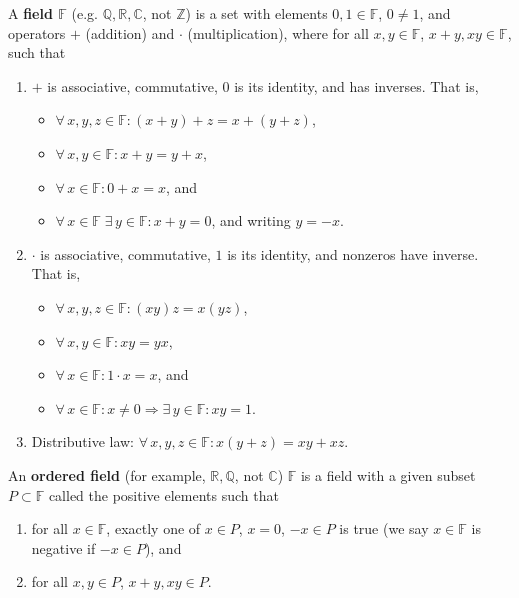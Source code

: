 \documentclass{notes}
\begin{document}
\begin{defn}
  A {\boldmath \bfseries field $\mathbb F$} (e.g. $\mathbb Q, \mathbb R, \mathbb C$, not $\mathbb Z$) is a set with elements $0, 1 \in \mathbb F$, $0 \neq 1$, and operators $+$ (addition) and $\cdot$ (multiplication), where for all $x, y \in \mathbb F$, $x + y, x y \in \mathbb F$, such that
  \begin{enumerate}
    \item $+$ is associative, commutative, $0$ is its identity, and has inverses.
    That is, 
    \begin{itemize}
      \item $\forall \, x, y, z \in \mathbb F: (x + y) + z = x + (y + z)$, 

      \item $\forall \, x, y \in \mathbb F: x + y = y + x$, 

      \item $\forall \, x \in \mathbb F: 0 + x = x$, and

      \item $\forall \, x \in \mathbb F \; \exists \, y \in \mathbb F: x + y = 0$, and writing $y = -x$.
    \end{itemize}

    \item $\cdot$ is associative, commutative, $1$ is its identity, and nonzeros have inverse.
    That is, 
    \begin{itemize}
      \item $\forall \, x, y, z \in \mathbb F: (x y) z = x (y z)$, 

      \item $\forall \, x, y \in \mathbb F: x y = y x$, 

      \item $\forall \, x \in \mathbb F: 1 \cdot x = x$, and 

      \item $\forall \, x \in \mathbb F: x \neq 0 \Rightarrow \exists \, y \in \mathbb F: x y = 1$.
    \end{itemize}

    \item Distributive law: $\forall \, x, y, z \in \mathbb F: x (y + z) = x y + x z$.
  \end{enumerate}
\end{defn}

\begin{defn}
  An {\boldmath \bfseries ordered field} (for example, $\mathbb R, \mathbb Q$, not $\mathbb C$) $\mathbb F$ is a field with a given subset $P \subset \mathbb F$ called the positive elements such that 
  \begin{enumerate}
    \item for all $x \in \mathbb F$, exactly one of $x \in P$, $x = 0$, $-x \in P$ is true (we say $x \in \mathbb F$ is negative if $-x \in P$), and 

    \item for all $x, y \in P$, $x + y, x y \in P$.
  \end{enumerate}
\end{defn}
\end{document}
